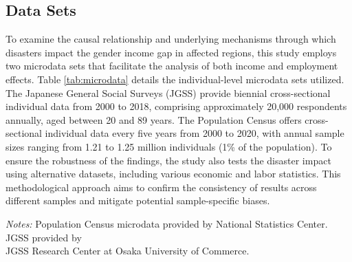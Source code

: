 \documentclass[a4paper,12pt]{article}
\begin{document}
\subsection{Data Sets}

To examine the causal relationship and underlying mechanisms through which disasters impact the gender income gap in affected regions, this study employs two microdata sets that facilitate the analysis of both income and employment effects. Table \ref{tab:microdata} details the individual-level microdata sets utilized. The Japanese General Social Surveys (JGSS) provide biennial cross-sectional individual data from 2000 to 2018, comprising approximately 20,000 respondents annually, aged between 20 and 89 years. The Population Census offers cross-sectional individual data every five years from 2000 to 2020, with annual sample sizes ranging from 1.21 to 1.25 million individuals (1\% of the population). To ensure the robustness of the findings, the study also tests the disaster impact using alternative datasets, including various economic and labor statistics. This methodological approach aims to confirm the consistency of results across different samples and mitigate potential sample-specific biases.


\begin{table}[htbp]
    \centering
    \caption{Individual-level Microdata Sets}
    \label{tab:microdata}
    \begin{threeparttable}
    \renewcommand{\arraystretch}{1.2}
    \setlength{\tabcolsep}{8pt} %
    \small
    \begin{tablenotes}
      \footnotesize
      \item \textit{Notes:} Population Census microdata provided by National Statistics Center. JGSS provided by \\ JGSS Research Center at Osaka University of Commerce.
    \end{tablenotes}
    \end{threeparttable}
\end{table}
\end{document}
